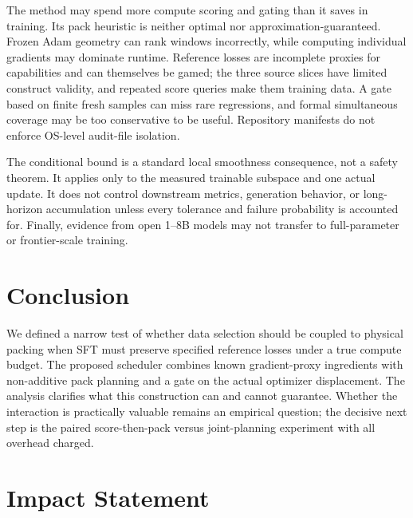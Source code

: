 \documentclass{article}
\begin{document}
The method may spend more compute scoring and gating than it saves in training.
Its pack heuristic is neither optimal nor approximation-guaranteed. Frozen
Adam geometry can rank windows incorrectly, while computing individual
gradients may dominate runtime. Reference losses are incomplete proxies for
capabilities and can themselves be gamed; the three source slices have limited
construct validity, and repeated score queries make them training data. A gate
based on finite fresh samples can miss rare regressions, and formal
simultaneous coverage may be too conservative to be useful. Repository
manifests do not enforce OS-level audit-file isolation.

The conditional bound is a standard local smoothness consequence, not a safety
theorem. It applies only to the measured trainable subspace and one actual
update. It does not control downstream metrics, generation behavior, or
long-horizon accumulation unless every tolerance and failure probability is
accounted for. Finally, evidence from open 1--8B models may not transfer to
full-parameter or frontier-scale training.

\section{Conclusion}
\label{sec:conclusion}

We defined a narrow test of whether data selection should be coupled to
physical packing when SFT must preserve specified reference losses under a
true compute budget. The proposed scheduler combines known gradient-proxy
ingredients with non-additive pack planning and a gate on the actual optimizer
displacement. The analysis clarifies what this construction can and cannot
guarantee. Whether the interaction is practically valuable remains an
empirical question; the decisive next step is the paired score-then-pack versus
joint-planning experiment with all overhead charged.


\section*{Impact Statement}
\end{document}

